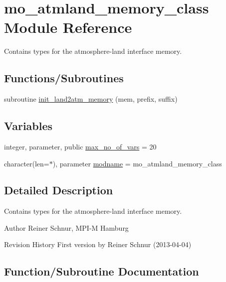 \hypertarget{namespacemo__atmland__memory__class}{}\section{mo\+\_\+atmland\+\_\+memory\+\_\+class Module Reference}
\label{namespacemo__atmland__memory__class}


Contains types for the atmosphere-\/land interface memory.  


\subsection*{Functions/\+Subroutines}
\begin{DoxyCompactItemize}
\item 
subroutine \hyperlink{namespacemo__atmland__memory__class_a374d0d01cacf18ff46609c87546c67b9}{init\+\_\+land2atm\+\_\+memory} (mem, prefix, suffix)
\end{DoxyCompactItemize}
\subsection*{Variables}
\begin{DoxyCompactItemize}
\item 
integer, parameter, public \hyperlink{namespacemo__atmland__memory__class_afae3263e73e4c64ed0955c7ac81cd609}{max\+\_\+no\+\_\+of\+\_\+vars} = 20
\item 
character(len=$\ast$), parameter \hyperlink{namespacemo__atmland__memory__class_a61803b8c6f643016537157a3763a73c6}{modname} = \textquotesingle{}mo\+\_\+atmland\+\_\+memory\+\_\+class\textquotesingle{}
\end{DoxyCompactItemize}


\subsection{Detailed Description}
Contains types for the atmosphere-\/land interface memory. 

\begin{DoxyAuthor}{Author}
Reiner Schnur, M\+P\+I-\/\+M Hamburg
\end{DoxyAuthor}
\begin{DoxyParagraph}{Revision History}
First version by Reiner Schnur (2013-\/04-\/04) 
\end{DoxyParagraph}


\subsection{Function/\+Subroutine Documentation}
\hypertarget{namespacemo__atmland__memory__class_a374d0d01cacf18ff46609c87546c67b9}{}
